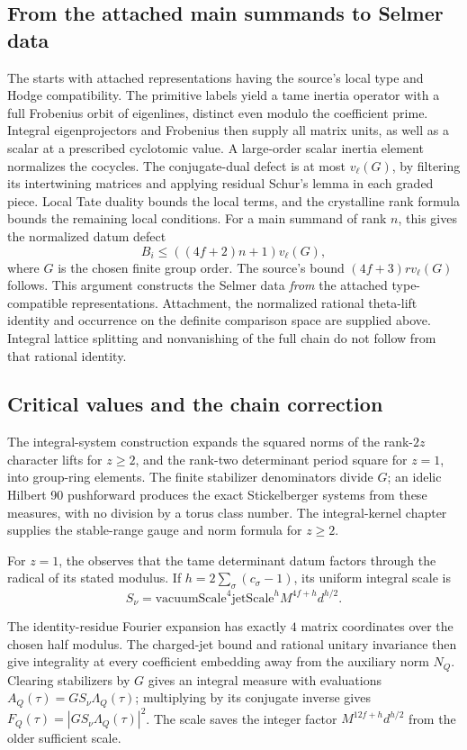 \subsection{From the attached main summands to Selmer data}
The 
starts with attached representations having the source's local
type and Hodge compatibility. The primitive labels yield a tame
inertia operator with a full Frobenius orbit of eigenlines, distinct
even modulo the coefficient prime. Integral eigenprojectors and
Frobenius then supply all matrix units, as well as a scalar at a
prescribed cyclotomic value. A large-order scalar inertia element
normalizes the cocycles. The conjugate-dual defect is at most
\(v_\ell(G)\), by filtering its intertwining matrices and applying
residual Schur's lemma in each graded piece. Local Tate duality
bounds the local terms, and the crystalline rank formula bounds
the remaining local conditions. For a main summand of rank \(n\),
this gives the normalized datum defect
\[
 B_i\le ((4f+2)n+1)v_\ell(G),
\]
where \(G\) is the chosen finite group order. The source's bound
\((4f+3)r v_\ell(G)\) follows. This argument constructs the
Selmer data \emph{from} the attached type-compatible representations.
Attachment, the normalized rational theta-lift identity and occurrence
on the definite comparison space are supplied above. Integral lattice
splitting and nonvanishing of the full chain do not follow from that
rational identity.

\subsection{Critical values and the chain correction}
The 
{integral-system construction} expands the squared norms of
the rank-\(2z\) character lifts for \(z\ge2\), and the
rank-two determinant period square for \(z=1\), into group-ring
elements. The finite stabilizer denominators divide \(G\);
an idelic Hilbert 90 pushforward produces the exact
Stickelberger systems from these measures, with no division
by a torus class number. The integral-kernel chapter supplies the
stable-range gauge and norm formula for \(z\ge2\).

\begin{samepage}
For \(z=1\), the
 observes that the tame determinant datum factors
through the radical of its stated modulus. If
\(h=2\sum_\sigma(c_\sigma-1)\), its uniform integral scale is
\[
 S_\nu=\mathrm{vacuumScale}^{4}\mathrm{jetScale}^{h}
                       M^{4f+h}d^{h/2}.
\]
\end{samepage}
The identity-residue Fourier expansion has exactly \(4\) matrix
coordinates over the chosen half modulus. The charged-jet bound and
rational unitary invariance then give integrality at every coefficient
embedding away from the auxiliary norm \(N_Q\). Clearing stabilizers
by \(G\) gives an integral measure with evaluations
\(A_Q(\tau)=GS_\nu\Lambda_Q(\tau)\); multiplying by its conjugate
inverse gives \(F_Q(\tau)=|GS_\nu\Lambda_Q(\tau)|^2\).
The scale saves the integer factor
\(M^{12f+h}d^{h/2}\) from the older sufficient scale.

